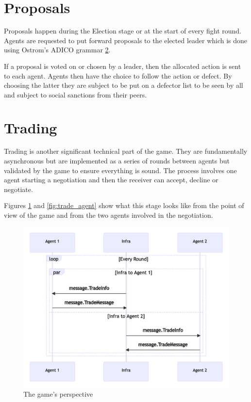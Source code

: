 \section{Proposals}
Proposals happen during the Election stage or at the start of every fight round. Agents are requested to put forward proposals to the elected leader which is done using Ostrom’s ADICO grammar \ref{}.

If a proposal is voted on or chosen by a leader, then the allocated action is sent to each agent. Agents then have the choice to follow the action or defect. By choosing the latter they are subject to be put on a defector list to be seen by all and subject to social sanctions from their peers.

\section{Trading}
Trading is another significant technical part of the game. They are fundamentally asynchronous but are implemented as a series of rounds between agents but validated by the game to ensure everything is sound. The process involves one agent starting a negotiation and then the receiver can accept, decline or negotiate.

Figures \ref{fig:trade_game} and \ref{fig:trade_agent} show what this stage looks like from the point of view of the game and from the two agents involved in the negotiation.

\begin{figure}[htb]
    \centering
    \includegraphics{003_infrastructure/images/trade1.png}
    \caption{The game's perspective}
    \label{fig:trade_game}
\end{figure}

